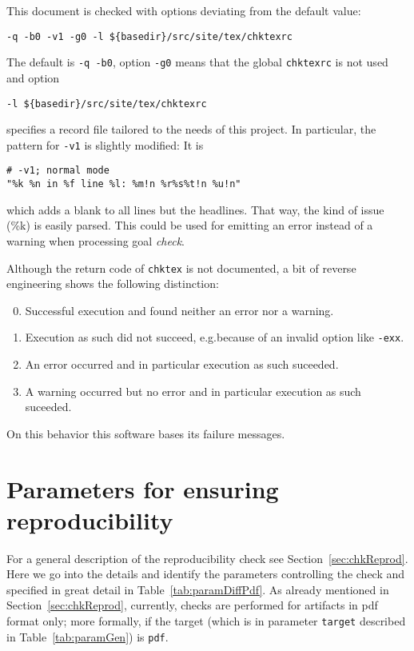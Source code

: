 This document is checked with options deviating from the default value: 
%
\begin{verbatim}
-q -b0 -v1 -g0 -l ${basedir}/src/site/tex/chktexrc
\end{verbatim}
%
The default is \texttt{-q -b0}, 
option \texttt{-g0} means that the global \texttt{chktexrc} is not used 
and option 
%
\begin{verbatim}
-l ${basedir}/src/site/tex/chktexrc
\end{verbatim}
%
specifies a record file tailored to the needs of this project. 
In particular, the pattern for \texttt{-v1} is slightly modified: 
It is 
%
\begin{verbatim}
# -v1; normal mode
"%k %n in %f line %l: %m!n %r%s%t!n %u!n"
\end{verbatim}
%
which adds a blank to all lines but the headlines. 
That way, the kind of issue (\%k) is easily parsed. 
This could be used for emitting an error instead of a warning 
when processing goal \emph{check}. 

Although the return code of \texttt{chktex} is not documented, 
a bit of reverse engineering shows the following distinction: 
%
\begin{enumerate}\setcounter{enumi}{-1}
  \item Successful execution and found neither an error nor a warning. 
  \item Execution as such did not succeed, 
  e.g.\@ because of an invalid option like \texttt{-exx}. 
  \item An error occurred and in particular execution as such suceeded. 
  \item A warning occurred but no error and in particular execution as such suceeded. 
\end{enumerate}

On this behavior this software bases its failure messages. 


\section{Parameters for ensuring reproducibility}\label{sec:paramRepro}

For a general description of the reproducibility check 
see Section~\ref{sec:chkReprod}. 
Here we go into the details and identify the parameters 
controlling the check 
and specified in great detail in Table~\ref{tab:paramDiffPdf}. 
As already mentioned in Section~\ref{sec:chkReprod}, 
currently, checks are performed for artifacts in pdf format only; 
more formally, if the target 
(which is in parameter \texttt{target} described in Table~\ref{tab:paramGen}) 
is \texttt{pdf}. 

